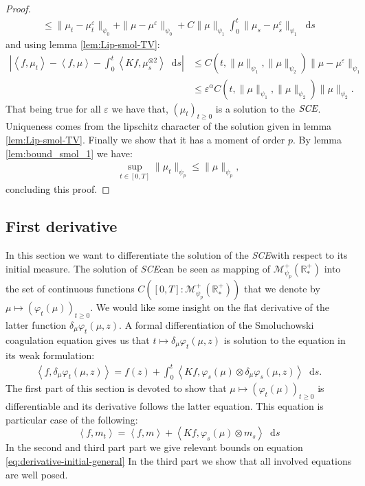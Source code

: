 \documentclass[11pt,a4paper]{article}
\newcommand{\RRP}{\mathbb{R}^+_*}
\newcommand{\MC}{\mathcal{M}}
\newcommand{\SCE}{\emph{SCE}}
\newcommand{\Proc}[1]{\left(#1\right)_{t\geq 0}}
\newcommand{\brac}[1]{\left\langle#1\right\rangle}
\newcommand{\dd}{\mathop{}\!\mathrm{d}}
\begin{document}
\begin{proof}
\begin{multline*}
        \leq \|\mu_t - \mu_t^\varepsilon\|_{\psi_0} + \|\mu - \mu^\varepsilon\|_{\psi_0} + C\|\mu\|_{\psi_1}\int_0^t \| \mu_s - \mu^\varepsilon_s \|_{\psi_1} \dd s
    \end{multline*}
    and using lemma \ref{lem:Lip-smol-TV}:
    \begin{align*}
        \left|\brac{f,\mu_t} - \brac{f,\mu} - \int_0^t\brac{Kf,\mu_s^{\otimes 2}}\dd s\right| &\leq C(t,\|\mu\|_{\psi_1},\|\mu\|_{\psi_2})\|\mu - \mu^\varepsilon\|_{\psi_1} \\
        &\leq \varepsilon^{\alpha} C(t,\|\mu\|_{\psi_1},\|\mu\|_{\psi_2})\|\mu\|_{\psi_2}.
    \end{align*}
    That being true for all $\varepsilon$ we have that, $\Proc{\mu_t}$ is a solution to the $\SCE$. Uniqueness comes from the lipschitz character of the solution given in lemma \ref{lem:Lip-smol-TV}. Finally we show that it has a moment of order $p$. By lemma \ref{lem:bound_smol_1} we have:
    \begin{align*}
        \sup\limits_{t \in [0,T]} \| \mu_t\|_{\psi_{p}} \leq  \| \mu\|_{\psi_{p}},
    \end{align*}
    concluding this proof.
\end{proof}

\subsection{First derivative}
In this section we want to differentiate the solution of the \SCE with respect to its initial measure. The solution of \SCE can be seen as mapping of $\MC^+_{\psi_p}\left(\RRP \right)$ into the set of continuous functions $C\left([0,T]:\MC^+_{\psi_p}\left(\RRP \right)\right)$ that we denote by $\mu \mapsto \Proc{\varphi_t(\mu)}$. We would like some insight on the flat derivative of the latter function $\delta_\mu \varphi_t(\mu,z)$. A formal differentiation of the Smoluchowski coagulation equation gives us that $t \mapsto \delta_\mu \varphi_t(\mu,z)$ is solution to the equation in its weak formulation:
\begin{align*}
    \brac{f,\delta_\mu \varphi_t(\mu,z)} = f(z) + \int_0^t \brac{Kf,\varphi_s(\mu)\otimes \delta_\mu \varphi_s(\mu,z)}\dd s.
\end{align*}
The first part of this section is devoted to show that $\mu \mapsto \Proc{\varphi_t(\mu)}$ is differentiable and its derivative follows the latter equation. This equation is particular case of the following: 
\begin{equation}\label{eq:derivative-initial-general}
    \brac{f,m_t} = \brac{f,m} + \brac{Kf,\varphi_s(\mu)\otimes m_s}\dd s
\end{equation}
In the second and third part part we give relevant bounds on equation \ref{eq:derivative-initial-general} In the third part we show that all involved equations are well posed.
\end{document}
